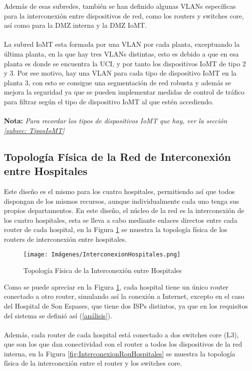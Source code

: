 Además de esas subredes, también se han definido algunas VLANs específicas para la interconexión entre dispositivos de red, como los routers y switches core, así como para la DMZ interna y la DMZ IoMT.
\\ \\
La subred IoMT esta formada por una VLAN por cada planta, exceptuando la última planta, en la que hay tres VLANs distintas, esto es debido a que en esa planta es donde se encuentra la UCI, y por tanto los dispositivos IoMT de tipo 2 y 3.
Por ese motivo, hay una VLAN para cada tipo de dispositivo IoMT en la planta 3, con esto se consigue una segmentación de red robusta y además se mejora la seguridad ya que se pueden implementar medidas de control de tráfico para filtrar según el tipo de dispositivo IoMT al que estén accediendo.
\\ \\
{\small \textbf{Nota:} \textit{Para recordar los tipos de dispositivos IoMT que hay, ver la sección \ref{subsec: TiposIoMT}}}


\subsection{Topología Física de la Red de Interconexión entre Hospitales}
Este diseño es el mismo para los cuatro hospitales, permitiendo así que todos dispongan de los mismos recursos, aunque individualmente cada uno tenga sus propios departamentos.
En este diseño, el núcleo de la red es la interconexión de los cuatro hospitales, esta se lleva a cabo mediante enlaces directos entre cada router de cada hospital, en la Figura \ref{fig:InterconexionHospitales}
se muestra la topología física de los routers de interconexión entre hospitales.

\begin{figure}[H]
    \centering
    \texttt{[image: Imágenes/InterconexionHospitales.png]}
    \caption{Topología Física de la Interconexión entre Hospitales}
    \label{fig:InterconexionHospitales}
\end{figure}

Como se puede apreciar en la Figura \ref{fig:InterconexionHospitales}, cada hospital tiene un único router conectado a otro router, simulando así la conexión a Internet, excepto en el caso del Hospital de Son Espases, que 
tiene dos ISPs distintos, ya que en los requisitos del sistema se definió así (\ref{análisis}).
\\ \\
Además, cada router de cada hospital está conectado a dos switches core (L3), que son los que dan conectividad con el router a todos los dispositivos de la red interna, en la Figura 
\ref{fig:InterconexionRouHospitales} se muestra la topología física de la interconexión entre el router y los switches core. 

